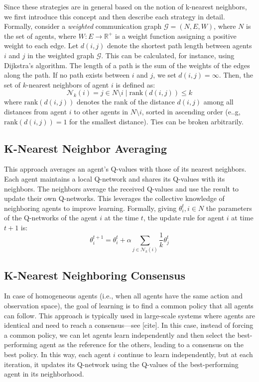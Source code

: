 \documentclass[sigconf]{acmart}
\begin{document}
Since these strategies are in general based on the notion of k-nearest neighbors,
we first introduce this concept and then describe each strategy in detail.
Formally, consider a \emph{weighted} communication graph $\mathcal{G} = (N, E, W)$, where $N$ is the set of agents, where $W: E \rightarrow \mathbb{R}^+$ is a weight function assigning a positive weight to each edge.  
Let $d(i,j)$ denote the shortest path length between agents $i$ and $j$ in the weighted graph $\mathcal{G}$. 
This can be calculated, for instance, using Dijkstra's algorithm. 
The length of a path is the sum of the weights of the edges along the path. If no path exists between $i$ and $j$, we set $d(i,j) = \infty$.
%
Then, the set of $k$-nearest neighbors of agent $i$ is defined as:
$$ \mathcal{N}_k(i) = { j \in N \setminus {i} \mid \text{rank}(d(i,j)) \leq k } $$
where $\text{rank}(d(i,j))$ denotes the rank of the distance $d(i,j)$ among all distances from agent $i$ to other agents in $N \setminus {i}$, sorted in ascending order (e..g, $\text{rank}(d(i,j)) = 1$ for the smallest distance).
Ties can be broken arbitrarily.

\subsection{K-Nearest Neighbor Averaging}
This approach averages an agent's Q-values with those of its nearest neighbors. 
Each agent maintains a local Q-network and shares its Q-values with its neighbors. 
The neighbors average the received Q-values and use the result to update their own Q-networks. 
This leverages the collective knowledge of neighboring agents to improve learning.
%
Formally, giving $\theta^t_i, i \in N$ the parameters of the Q-networks of the agent $i$ at the time $t$,
the update rule for agent $i$ at time $t+1$ is:
\begin{equation}
  \theta^{t+1}_i = \theta^t_i + \alpha \sum_{j \in \mathcal{N}_k(i)} \frac{1}{k} \theta^t_j
\end{equation}

\subsection{K-Nearest Neighboring Consensus}
In case of homogeneous agents (i.e., when all agents have the same action and observation space),
the goal of learning is to find a common policy that all agents can follow.
This approach is typically used in large-scale systems where agents are identical and need to reach a consensus---see [cite].
%
In this case, instead of forcing a common policy, we can let agents learn independently and then select the best-performing agent as the reference for the others, leading to a consensus on the best policy.
%
In this way, each agent $i$ continue to learn independently, but at each iteration, it updates its Q-network using the Q-values of the best-performing agent in its neighborhood.
\end{document}
